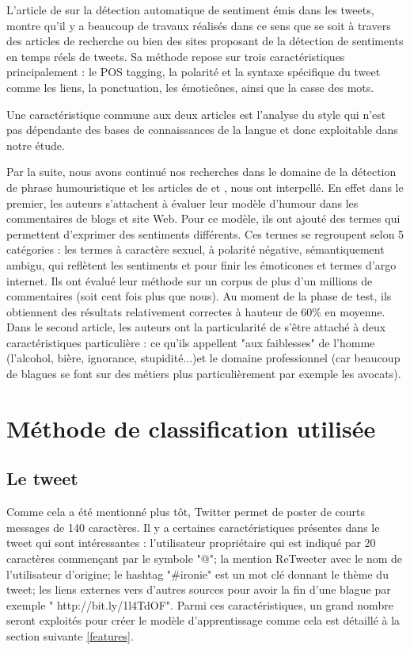 \documentclass[10pt,a4paper,twoside]{article}
\begin{document}
L’article de \cite{Barbosa2010} sur la détection automatique de sentiment émis dans les tweets, montre qu’il y a beaucoup de travaux réalisés dans ce sens que se soit à travers des articles de recherche ou bien des sites proposant de la détection de sentiments en temps réels de tweets.  Sa méthode repose sur trois caractéristiques principalement : le POS tagging, la polarité et la syntaxe spécifique du tweet comme les liens, la ponctuation, les émoticônes, ainsi que la casse des mots. 

Une caractéristique commune aux deux articles est l’analyse du style qui n’est pas dépendante des bases de connaissances de la langue et donc exploitable dans notre étude. 

Par la suite, nous avons continué nos recherches dans le domaine de la détection de phrase humouristique et les articles de \cite{ReyesPRS10}  et \cite{MihalceaP07}, nous ont interpellé. En effet dans le premier, les auteurs s'attachent à évaluer leur modèle d'humour dans les commentaires de blogs et site Web. Pour ce modèle, ils ont ajouté des termes qui permettent d'exprimer des sentiments différents. Ces termes se regroupent selon 5 catégories : les termes à caractère sexuel, à polarité négative, sémantiquement ambigu, qui reflètent les sentiments et pour finir les émoticones et termes d'argo internet. Ils ont évalué leur méthode sur un corpus de plus d'un millions de commentaires (soit cent fois plus que nous). Au moment de la phase de test, ils obtiennent des résultats relativement correctes à hauteur de 60\% en moyenne. Dans le second article, les auteurs ont la particularité de s'être attaché à deux caractéristiques particulière : ce qu'ils appellent "aux faiblesses" de l'homme (l'alcohol, bière, ignorance, stupidité...)et le domaine professionnel (car beaucoup de blagues se font sur des métiers plus particulièrement par exemple les avocats).

\section{Méthode de classification utilisée}
\label{methClass}
\subsection{Le tweet} 
Comme cela a été mentionné plus tôt, Twitter permet de poster de courts messages de 140 caractères. Il y a certaines caractéristiques présentes dans le tweet qui sont intéressantes : l'utilisateur propriétaire qui est indiqué par 20 caractères commençant par le symbole "@"; la mention ReTweeter avec le nom de l'utilisateur d'origine; le hashtag "\#ironie" est un mot clé donnant le thème du tweet; les liens externes vers d'autres sources pour avoir la fin d'une blague par exemple " http://bit.ly/1l4TdOF". Parmi ces caractéristiques, un grand nombre seront exploités pour créer le modèle d'apprentissage comme cela est détaillé à la section suivante \ref{features}.
\end{document}
